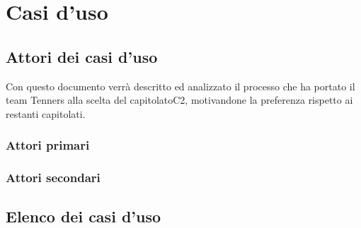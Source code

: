 \section{Casi d'uso}

\subsection{Attori dei casi d'uso}
Con questo documento verrà descritto ed analizzato il processo che ha portato il team Tenners alla scelta del capitolato\glo C2, motivandone la preferenza rispetto ai restanti capitolati.
\subsubsection{Attori primari}
\subsubsection{Attori secondari}

\subsection{Elenco dei casi d'uso}